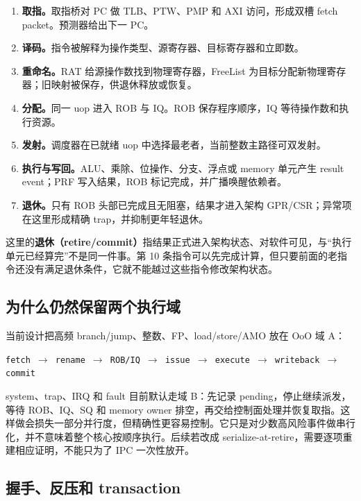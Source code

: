 \documentclass[UTF8,a4paper,zihao=-4,oneside]{ctexart}
\begin{document}
\begin{enumerate}
  \item \textbf{取指。}取指桥对 PC 做 TLB、PTW、PMP 和 AXI 访问，形成双槽 fetch packet。预测器给出下一 PC。
  \item \textbf{译码。}指令被解释为操作类型、源寄存器、目标寄存器和立即数。
  \item \textbf{重命名。}RAT 给源操作数找到物理寄存器，FreeList 为目标分配新物理寄存器；旧映射被保存，供退休释放或恢复。
  \item \textbf{分配。}同一 uop 进入 ROB 与 IQ。ROB 保存程序顺序，IQ 等待操作数和执行资源。
  \item \textbf{发射。}调度器在已就绪 uop 中选择最老者，当前整数主路径可双发射。
  \item \textbf{执行与写回。}ALU、乘除、位操作、分支、浮点或 memory 单元产生 result event；PRF 写入结果，ROB 标记完成，并广播唤醒依赖者。
  \item \textbf{退休。}只有 ROB 头部已完成且无阻塞，结果才进入架构 GPR/CSR；异常项在这里形成精确 trap，并抑制更年轻退休。
\end{enumerate}

这里的\textbf{退休（retire/commit）}指结果正式进入架构状态、对软件可见，与“执行单元已经算完”不是同一件事。第 10 条指令可以先完成计算，但只要前面的老指令还没有满足退休条件，它就不能越过这些指令修改架构状态。

\subsection{为什么仍然保留两个执行域}

当前设计把高频 branch/jump、整数、FP、load/store/AMO 放在 OoO 域 A：

\begin{center}
\texttt{fetch $\rightarrow$ rename $\rightarrow$ ROB/IQ $\rightarrow$ issue $\rightarrow$ execute $\rightarrow$ writeback $\rightarrow$ commit}
\end{center}

system、trap、IRQ 和 fault 目前默认走域 B：先记录 pending，停止继续派发，等待 ROB、IQ、SQ 和 memory owner 排空，再交给控制面处理并恢复取指。这样做会损失一部分并行度，但精确性更容易控制。它只是对少数高风险事件做串行化，并不意味着整个核心按顺序执行。后续若改成 serialize-at-retire，需要逐项重建相应证明，不能只为了 IPC 一次性放开。

\subsection{握手、反压和 transaction}
\end{document}
